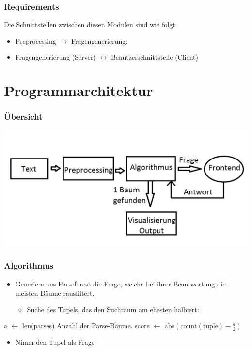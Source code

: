 \documentclass{beamer} %
\begin{document}
\begin{frame}
    \frametitle{Requirements}
    Die Schnittstellen zwischen diesen Modulen sind wie folgt:
    \begin{itemize}
        \item Preprocessing $\rightarrow$ Fragengenerierung:
        \item Fragengenerierung (Server)  $\leftrightarrow$ Benutzerschnittstelle (Client)
    \end{itemize}
\end{frame}

\section{Programmarchitektur}

\begin{frame}
    \frametitle{Übersicht}
    \includegraphics[scale=0.4]{Grafik}
\end{frame}

\begin{frame}
    \frametitle{Algorithmus}
    \begin{itemize}
        \item Generiere aus Parseforest die Frage, welche bei ihrer Beantwortung die meisten Bäume rausfiltert.
            \begin{itemize}
                \item Suche des Tupels, das den Suchraum am ehesten halbiert:
            \end{itemize}
    \end{itemize}
    \begin{algorithmic}
        \State a $\gets$ len(parses) \Comment Anzahl der Parse-Bäume.
        \State score $\gets$ $\mathrm{abs}(\mathrm{count(tuple)} - \frac{a}{2})$
        \EndFor
    \end{algorithmic}
    \begin{itemize}
        \item Nimm den Tupel als Frage
    \end{itemize}
\end{frame}
\end{document}
